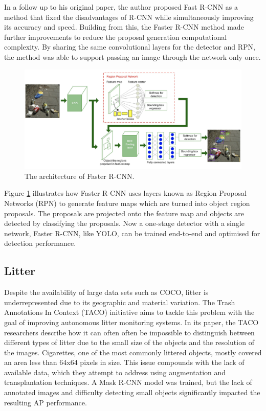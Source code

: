 \documentclass{thesis}
\begin{document}
In a follow up to his original paper, the author proposed Fast R-CNN as a method that fixed the disadvantages of R-CNN while simultaneously improving its accuracy and speed\cite{fast-rcnn}. Building from this, the Faster R-CNN method made further improvements to reduce the proposal generation computational complexity. By sharing the same convolutional layers for the detector and RPN, the method was able to support passing an image through the network only once\cite{frcnn}.

\begin{figure}[h]
    \centering
    \includegraphics[scale=0.5]{images/faster-rcnn-architecture.png}
    \caption{The architecture of Faster R-CNN\cite{smart-street}.}
    \label{fig:faster-rcnn-architecture}
\end{figure}

Figure \ref{fig:faster-rcnn-architecture} illustrates how Faster R-CNN uses layers known as Region Proposal Networks (RPN) to generate feature maps which are turned into object region proposals. The proposals are projected onto the feature map and objects are detected by classifying the proposals. Now a one-stage detector with a single network, Faster R-CNN, like YOLO\cite{yolov1}, can be trained end-to-end and optimised for detection performance.

\subsection{Litter}

Despite the availability of large data sets such as COCO\cite{lin2015microsoft}, litter is underrepresented due to its geographic and material variation. The Trash Annotations In Context (TACO) initiative aims to tackle this problem with the goal of improving autonomous litter monitoring systems\cite{DBLP:journals/corr/abs-2003-06975}. In its paper, the TACO researchers describe how it can often often be impossible to distinguish between different types of litter due to the small size of the objects and the resolution of the images. Cigarettes, one of the most commonly littered objects, mostly covered an area less than 64x64 pixels in size. This issue compounds with the lack of available data, which they attempt to address using augmentation and transplantation techniques. A Mask R-CNN model was trained, but the lack of annotated images and difficulty detecting small objects significantly impacted the resulting AP performance.
\end{document}
